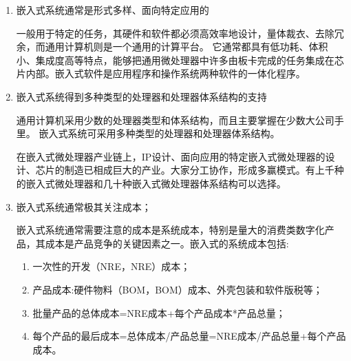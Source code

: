 \begin{enumerate}
\item 嵌{\cf}入式{\cf}系统{\cf}通常{\cf}是形{\cf}式多{\cf}样、{\cf}面向{\cf}特定{\cf}应用{\cf}的

一{\cf}般用{\cf}于特{\cf}定的{\cf}任务{\cf}，其{\cf}硬件{\cf}和软{\cf}件都{\cf}必须{\cf}高效{\cf}率地{\cf}设计{\cf}，量{\cf}体裁{\cf}衣、{\cf}去除{\cf}冗余{\cf}，而{\cf}通用{\cf}计算{\cf}机则{\cf}是一{\cf}个通{\cf}用的{\cf}计算{\cf}平台{\cf}。 {\cf}它通{\cf}常都{\cf}具有{\cf}低功{\cf}耗、{\cf}体积{\cf}小、{\cf}集成{\cf}度高{\cf}等特{\cf}点，{\cf}能够{\cf}把通{\cf}用微{\cf}处理{\cf}器中{\cf}许多{\cf}由板{\cf}卡完{\cf}成的{\cf}任务{\cf}集成{\cf}在芯{\cf}片内{\cf}部。{\cf}嵌入{\cf}式软{\cf}件是{\cf}应用{\cf}程序{\cf}和操{\cf}作系{\cf}统两{\cf}种软{\cf}件的{\cf}一体{\cf}化程序。

\item 嵌{\cf}入式{\cf}系统{\cf}得到{\cf}多种{\cf}类型{\cf}的处{\cf}理器{\cf}和处{\cf}理器{\cf}体系{\cf}结构{\cf}的支持

通{\cf}用计{\cf}算机{\cf}采用{\cf}少数{\cf}的处{\cf}理器{\cf}类型{\cf}和体{\cf}系结{\cf}构，{\cf}而且{\cf}主要{\cf}掌握{\cf}在少{\cf}数大{\cf}公司{\cf}手里{\cf}。 {\cf}嵌入{\cf}式系{\cf}统可{\cf}采用{\cf}多种{\cf}类型{\cf}的处{\cf}理器{\cf}和处{\cf}理器{\cf}体系{\cf}结构。

在{\cf}嵌入{\cf}式微{\cf}处理{\cf}器产{\cf}业链{\cf}上，{\cf}IP{\cf}设计{\cf}、面{\cf}向应{\cf}用的{\cf}特定{\cf}嵌入{\cf}式微{\cf}处理{\cf}器的{\cf}设计{\cf}、芯{\cf}片的{\cf}制造{\cf}已相{\cf}成巨{\cf}大的{\cf}产业{\cf}。大{\cf}家分{\cf}工协{\cf}作，{\cf}形成{\cf}多赢{\cf}模式{\cf}。有{\cf}上千{\cf}种的{\cf}嵌入{\cf}式微{\cf}处理{\cf}器和{\cf}几十{\cf}种嵌{\cf}入式{\cf}微处{\cf}理器{\cf}体系{\cf}结构{\cf}可以{\cf}选择{\cf}。

\item 嵌入{\cf}式系{\cf}统通{\cf}常极{\cf}其关{\cf}注成{\cf}本；

嵌{\cf}入式{\cf}系统{\cf}通常{\cf}需要{\cf}注意{\cf}的成{\cf}本是{\cf}系统{\cf}成本{\cf}，特{\cf}别是{\cf}量大{\cf}的消{\cf}费类{\cf}数字{\cf}化产{\cf}品，{\cf}其成{\cf}本是{\cf}产品{\cf}竞争{\cf}的关{\cf}键因{\cf}素之{\cf}一。{\cf}嵌入{\cf}式的{\cf}系统{\cf}成本{\cf}包括:
\begin{enumerate}
\item 一次{\cf}性的{\cf}开发（\acrlong{NRE}，\acrshort{NRE}）成本；
\item 产{\cf}品成{\cf}本:{\cf}硬件{\cf}物料（\acrlong{BOM}，\acrshort{BOM}）成{\cf}本、{\cf}外壳{\cf}包装{\cf}和软{\cf}件版{\cf}税等；
\item 批{\cf}量产{\cf}品的{\cf}总体{\cf}成本{\cf}=N{\cf}RE{\cf}成本{\cf}+每{\cf}个产{\cf}品成{\cf}本*{\cf}产品{\cf}总量{\cf}；
\item 每{\cf}个产{\cf}品的{\cf}最后{\cf}成本{\cf}=总{\cf}体成{\cf}本/{\cf}产品{\cf}总量{\cf}=N{\cf}RE{\cf}成本{\cf}/产{\cf}品总{\cf}量+{\cf}每个{\cf}产品{\cf}成本。
\end{enumerate}


\end{enumerate}
